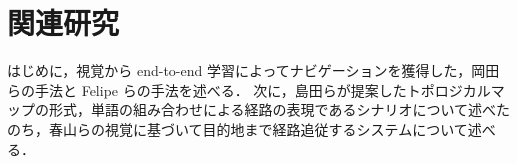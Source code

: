 \chapter{関連研究}
\label{chap:prior}
はじめに，視覚から end-to-end 学習によってナビゲーションを獲得した，岡田らの手法と Felipe らの手法を述べる．
次に，島田らが提案したトポロジカルマップの形式，単語の組み合わせによる経路の表現であるシナリオについて述べたのち，春山らの視覚に基づいて目的地まで経路追従するシステムについて述べる．

\clearpage



\clearpage


